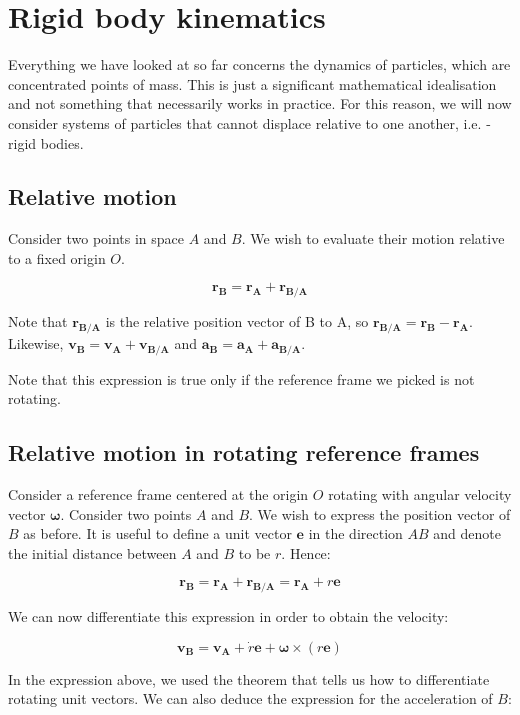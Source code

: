 \documentclass[12pt]{article}
\begin{document}
\newpage

\section{Rigid body kinematics}

Everything we have looked at so far concerns the dynamics of particles, which are concentrated points of mass. This is just a significant mathematical idealisation and not something that necessarily works in practice. For this reason, we will now consider systems of particles that cannot displace relative to one another, i.e. - rigid bodies.

\subsection{Relative motion}

Consider two points in space $A$ and $B$. We wish to evaluate their motion relative to a fixed origin $O$.

\[ \mathbf{r_B} = \mathbf{r_A} + \mathbf{r_{B/A}} \]

Note that $\mathbf{r_{B/A}}$ is the relative position vector of B to A, so $\mathbf{r_{B/A}} = \mathbf{r_B} - \mathbf{r_A}$.
Likewise, $\mathbf{v_B} = \mathbf{v_A} + \mathbf{v_{B/A}}$ and $\mathbf{a_B} = \mathbf{a_A} + \mathbf{a_{B/A}}$.

Note that this expression is true only if the reference frame we picked is not rotating.

\subsection{Relative motion in rotating reference frames}

Consider a reference frame centered at the origin $O$ rotating with angular velocity vector $\mathbf{\omega}$. Consider two points $A$ and $B$. We wish to express the position vector of $B$ as before. It is useful to define a unit vector $\mathbf{e}$ in the direction $AB$ and denote the initial distance between $A$ and $B$ to be $r$. Hence:

\[ \mathbf{r_B} = \mathbf{r_A} + \mathbf{r_{B/A}} = \mathbf{r_A} + r\mathbf{e} \]

We can now differentiate this expression in order to obtain the velocity:

\[ \mathbf{v_B} = \mathbf{v_A} + \dot{r}\mathbf{e} + \mathbf{\omega} \times (r\mathbf{e}) \]

In the expression above, we used the theorem that tells us how to differentiate rotating unit vectors. We can also deduce the expression for the acceleration of $B$:
\end{document}
